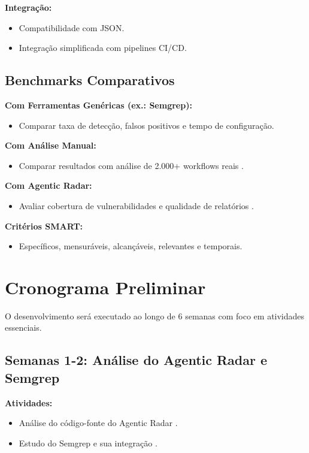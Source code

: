 \documentclass{sftex}
\begin{document}
\textbf{Integração:}
\begin{itemize}
  \item Compatibilidade com JSON.
  \item Integração simplificada com pipelines CI/CD.
\end{itemize}

\subsection{Benchmarks Comparativos}

\textbf{Com Ferramentas Genéricas (ex.: Semgrep):}
\begin{itemize}
  \item Comparar taxa de detecção, falsos positivos e tempo de configuração.
\end{itemize}

\textbf{Com Análise Manual:}
\begin{itemize}
  \item Comparar resultados com análise de 2.000+ workflows reais \cite{n8n_workflow_analysis}.
\end{itemize}

\textbf{Com Agentic Radar:}
\begin{itemize}
  \item Avaliar cobertura de vulnerabilidades e qualidade de relatórios \cite{splxai_n8n_scanning}.
\end{itemize}

\textbf{Critérios SMART:}
\begin{itemize}
  \item Específicos, mensuráveis, alcançáveis, relevantes e temporais.
\end{itemize}

\newpage
\section{Cronograma Preliminar}

O desenvolvimento será executado ao longo de 6 semanas com foco em atividades essenciais.

\subsection{Semanas 1-2: Análise do Agentic Radar e Semgrep}

\textbf{Atividades:}
\begin{itemize}
  \item Análise do código-fonte do Agentic Radar \cite{splxai_n8n_scanning}.
  \item Estudo do Semgrep e sua integração \cite{semgrep_platform}.
\end{itemize}
\end{document}
